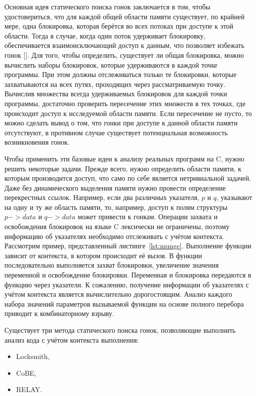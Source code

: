 Основная идея статического поиска гонок заключается в том, чтобы удостовериться, что для каждой общей области памяти существует, по крайней мере, одна блокировка, которая берётся во всех потоках при доступе к этой области. Тогда в случае, когда один поток удерживает блокировку, обеспечивается взаимоисключающий доступ к данным, что позволяет избежать гонок []. Для того, чтобы определить, существует ли общая блокировка, можно вычислить наборы блокировок, которые удерживаются в каждой точке программы. При этом должны отслеживаться только те блокировки, которые захватываются на всех путях, проходящих через рассматриваемую точку. Вычислив множества всегда удерживаемых блокировок для каждой точки программы, достаточно проверить пересечение этих множеств в тех точках, где происходит доступ к исследуемой области памяти. Если пересечение не пусто, то можно сделать вывод о том, что гонки при доступе к данной области памяти отсутствуют, в противном случае существует потенциальная возможность возникновения гонок.

Чтобы применить эти базовые идеи к анализу реальных программ на C, нужно решить некоторые задачи. Прежде всего, нужно определить области памяти, к которым производится доступ, что само по себе является нетривиальной задачей. Даже без динамического выделения памяти нужно провести определение перекрестных ссылок. Например, если два различных указателя, $p$ и $q$, указывают на одну и ту же область памяти, то, например, доступ к полям структуры $p->data$ и $q->data$ может привести к гонкам. Операции захвата и освобождения блокировок на языке C лексически не ограничены, поэтому информацию об указателях необходимо отслеживать с учётом контекста. Рассмотрим пример, представленный листинге~\ref{lst:munge}. Выполнение функции  зависит от контекста, в котором происходит её вызов. В функции последовательно выполняется захват блокировки, увеличение значения переменной и освобождение блокировки. Переменная и блокировка передаются в функцию через указатели. К сожалению, получение информации об указателях с учётом контекста является вычислительно дорогостоящим. Анализ каждого набора значений параметров вызываемой функции на основе полного перебора приводит к комбинаторному взрыву.



Существует три метода статического поиска гонок, позволяющие выполнить анализ кода с учётом контекста выполнения:

\begin{itemize}
  \item Locksmith,
  \item CoBE,
  \item RELAY.
\end{itemize}

